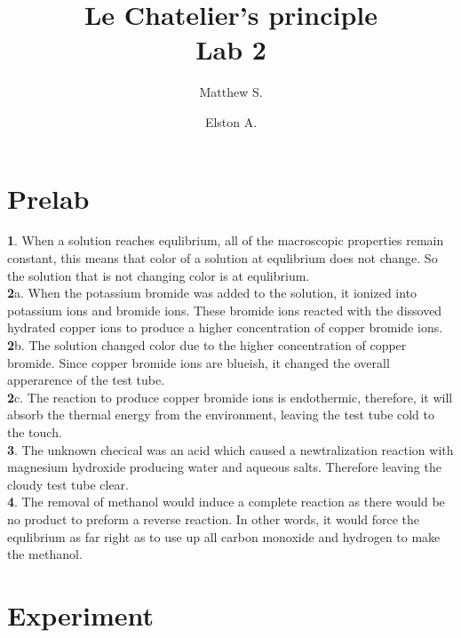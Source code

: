 \documentclass[12pt]{article}
\begin{document}
\title{ \vspace{-2cm} \textbf {Le Chatelier's principle}\\ Lab 2}
\author{Matthew S. \and Elston A.}

\maketitle

\section{Prelab}

\textbf 1. When a solution reaches equlibrium, all of the macroscopic properties remain constant, this means that color of a solution at equlibrium does not change. So the solution that is not changing color is at equlibrium. \\

\noindent
\textbf 2a. When the potassium bromide was added to the solution, it ionized into potassium ions and bromide ions. These bromide ions reacted with the dissoved hydrated copper ions to produce a higher concentration of copper bromide ions.\\

\noindent
 \textbf 2b. The solution changed color due to the higher concentration of copper bromide. Since copper bromide ions are blueish, it changed the overall apperarence of the test tube.\\

 \noindent
 \textbf 2c. The reaction to produce copper bromide ions is endothermic, therefore, it will absorb the thermal energy from the environment, leaving the test tube cold to the touch.\\

\noindent
\textbf 3. The unknown checical was an acid which caused a newtralization reaction with magnesium hydroxide producing water and aqueous salts. Therefore leaving the cloudy test tube clear.\\

\noindent
\textbf 4. The removal of methanol would induce a complete reaction as there would be no product to preform a reverse reaction. In other words, it would force the equlibrium as far right as to use up all carbon monoxide and hydrogen to make the methanol.
 
\newpage

\section{Experiment}
\end{document}
